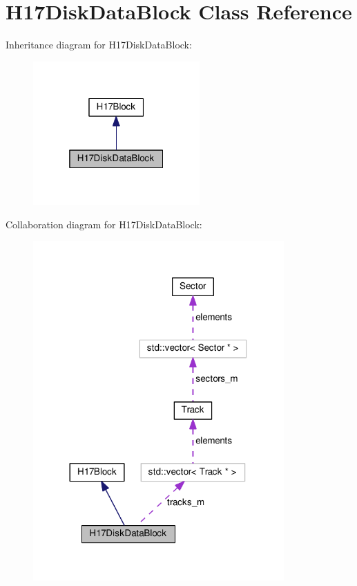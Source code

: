 \hypertarget{classH17DiskDataBlock}{}\section{H17\+Disk\+Data\+Block Class Reference}
\label{classH17DiskDataBlock}


Inheritance diagram for H17\+Disk\+Data\+Block\+:\nopagebreak
\begin{figure}[H]
\begin{center}
\leavevmode
\includegraphics[width=181pt]{classH17DiskDataBlock__inherit__graph}
\end{center}
\end{figure}


Collaboration diagram for H17\+Disk\+Data\+Block\+:\nopagebreak
\begin{figure}[H]
\begin{center}
\leavevmode
\includegraphics[width=272pt]{classH17DiskDataBlock__coll__graph}
\end{center}
\end{figure}
